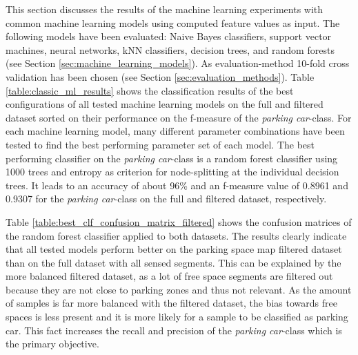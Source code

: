 This section discusses the results of the machine learning experiments with common machine learning models using computed feature values as input. The following models have been evaluated: Naive Bayes classifiers, support vector machines, neural networks, kNN classifiers, decision trees, and random forests (see Section \ref{sec:machine_learning_models}). As evaluation-method 10-fold cross validation has been chosen (see Section \ref{sec:evaluation_methods}). 
Table \ref{table:classic_ml_results} shows the classification results of the best configurations of all tested machine learning models on the full and filtered dataset sorted on their performance on the f-measure of the \emph{parking car}-class. For each machine learning model, many different parameter combinations have been tested to find the best performing parameter set of each model. The best performing classifier on the \emph{parking car}-class is a random forest classifier using 1000 trees and entropy as criterion for node-splitting at the individual decision trees. It leads to an accuracy of about 96\% and an f-measure value of 0.8961 and 0.9307 for the \emph{parking car}-class on the full and filtered dataset, respectively. 

Table \ref{table:best_clf_confusion_matrix_filtered} shows the confusion matrices of the random forest classifier applied to both datasets. The results clearly indicate that all tested models perform better on the parking space map filtered dataset than on the full dataset with all sensed segments. This can be explained by the more balanced filtered dataset, as a lot of free space segments are filtered out because they are not close to parking zones and thus not relevant.
As the amount of samples is far more balanced with the filtered dataset, the bias towards free spaces is less present and it is more likely for a sample to be classified as parking car. This fact increases the recall and precision of the \emph{parking car}-class which is the primary objective.


